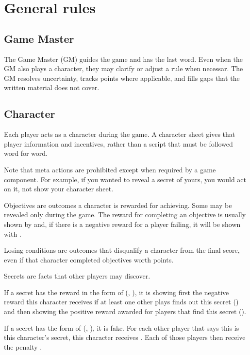 
\section{General rules}

\subsection{Game Master}
The Game Master (GM) guides the game and has the last word. Even when the GM also plays a character, they may clarify or adjust a rule when necessar. The GM resolves uncertainty, tracks points where applicable, and fills gaps that the written material does not cover.

\subsection{Character}
Each player acts as a character during the game. A character sheet gives that player information and incentives, rather than a script that must be followed word for word.

Note that meta actions are prohibited except when required by a game component. For example, if you wanted to reveal a secret of yours, you would act on it, not show your character sheet.

Objectives are outcomes a character is rewarded for achieving. Some may be revealed only during the game. The reward for completing an objective is usually shown by  and, if there is a negative reward for a player failing, it will be shown with .

Losing conditions are outcomes that disqualify a character from the final score, even if that character completed objectives worth points.

Secrets are facts that other players may discover.

If a secret has the reward in the form of (, ), it is showing first the negative reward this character receives if at least one other plays finds out this secret () and then showing the positive reward awarded for players that find this secret ().

If a secret has the form of (, ), it is fake. For each other player that says this is this character's secret, this character receives . Each of those players then receive the penalty . 

